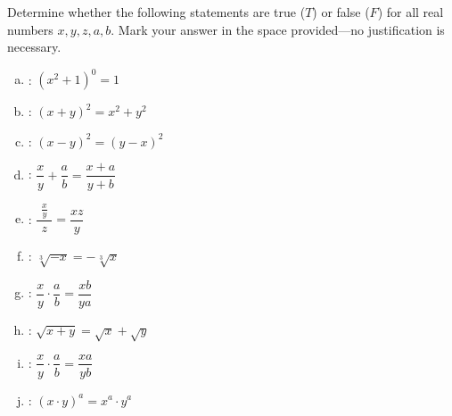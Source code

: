 \documentclass[12pt,letterpaper]{exam}
\begin{document}
\begin{questions}
\newpage
\question[10] Determine whether the following statements are true ($T$) or false ($F$) for all real numbers $x, y, z, a, b$. Mark your answer in the space provided---no justification is necessary. \pvspace{0.5cm}
	\begin{enumerate}[(a)]
	\item {}: $(x^2 + 1)^0= 1$ \vfill
	\item {}: $(x + y)^2= x^2 + y^2$ \vfill
	\item {}: $(x - y)^2= (y - x)^2$ \vfill
	\item {}: $\dfrac{x}{y} + \dfrac{a}{b}= \dfrac{x + a}{y + b}$ \vfill
	\item {}: $\dfrac{\,\,\frac{x}{y}\,\,}{z}= \dfrac{xz}{y}$ \vfill
	\item {}: $\sqrt[3]{-x}= -\sqrt[3]{x}$ \vfill
	\item {}: $\dfrac{x}{y} \cdot \dfrac{a}{b}= \dfrac{xb}{ya}$ \vfill
	\item {}: $\sqrt{x + y}= \sqrt{x} + \sqrt{y}$ \vfill
	\item {}: $\dfrac{x}{y} \cdot \dfrac{a}{b}= \dfrac{xa}{yb}$ \vfill
	\item {}: $(x \cdot y)^a= x^a \cdot y^a$
	\end{enumerate}

\end{questions}
\end{document}
